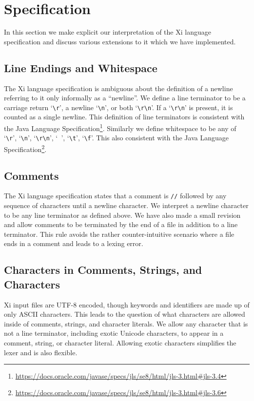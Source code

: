 \documentclass{hw}
\begin{document}
\section{Specification}\label{sec:specification}
In this section we make explicit our interpretation of the Xi language
specification and discuss various extensions to it which we have implemented.

\subsection{Line Endings and Whitespace}
The Xi language specification is ambiguous about the definition of a newline
referring to it only informally as a ``newline''. We define a line terminator
to be a carriage return `\verb$\r$', a newline `\verb$\n$', or both
`\verb$\r\n$'. If a `\verb$\r\n$' is present, it is counted as a single
newline. This definition of line terminators is consistent with the Java
Language
Specification\footnote{\url{https://docs.oracle.com/javase/specs/jls/se8/html/jls-3.html\#jls-3.4}}.
Similarly we define whitespace to be any of `\verb$\r$', `\verb$\n$',
`\verb$\r\n$', `\verb$ $', `\verb$\t$', `\verb$\f$'. This also consistent with
the Java Language
Specification\footnote{\url{https://docs.oracle.com/javase/specs/jls/se8/html/jls-3.html\#jls-3.6}}.

\subsection{Comments}
The Xi language specification states that a comment is \texttt{//} followed by
any sequence of characters until a newline character. We interpret a newline
character to be any line terminator as defined above. We have also made a small
revision and allow comments to be terminated by the end of a file in addition
to a line terminator. This rule avoids the rather counter-intuitive scenario
where a file ends in a comment and leads to a lexing error.

\subsection{Characters in Comments, Strings, and Characters}
Xi input files are UTF-8 encoded, though keywords and identifiers are made up
of only ASCII characters. This leads to the question of what characters are
allowed inside of comments, strings, and character literals. We allow any
character that is not a line terminator, including exotic Unicode characters,
to appear in a comment, string, or character literal. Allowing exotic
characters simplifies the lexer and is also flexible.
\end{document}

